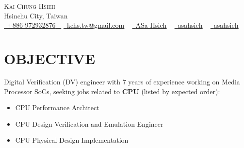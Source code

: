\documentclass[letterpaper,11pt]{article}
\newcommand{\resumeItem}[1]{
  \item\small{
    {#1 \vspace{-0.5pt}}
  }
}
\newcommand{\resumeItemListStart}{\begin{itemize}}
\newcommand{\resumeItemListEnd}{\end{itemize}\vspace{-5pt}}
\begin{document}


\begin{center}
    {\Huge \scshape Kai-Chung Hsieh} \\ \vspace{1pt}
    Hsinchu City, Taiwan \\ \vspace{1pt}
    \small \href{tel:+886972932876}{ \raisebox{-0.1\height}\faPhone\ \underline{+886-972932876} ~} \href{mailto:kchs.tw@gmail.com}{\raisebox{-0.2\height}\faGoogle\  \underline{kchs.tw@gmail.com}} ~ 
    \href{https://linkedin.com/in/asa-hsieh}{\raisebox{-0.2\height}\faLinkedinSquare\ \underline{ASa Hsieh}}  ~
    \href{https://github.com/asahsieh}{\raisebox{-0.2\height}\faGithub\ \underline{asahsieh}} ~
    \href{https://hackmd.io/@asahsieh}{\raisebox{-0.2\height}\faBook\ \underline{asahsieh}} ~
    \vspace{-8pt}
\end{center}
 

\section{OBJECTIVE}
    {Digital Verification (DV) engineer with 7 years of experience working on Media Processor SoCs, seeking jobs related to \textbf{CPU} (listed by expected order):}
        \resumeItemListStart
            \resumeItem{\normalsize{CPU Performance Architect}}
            \vspace{-5pt}
            \resumeItem{\normalsize{CPU Design Verification and Emulation Engineer}}
             \vspace{-5pt}
            \resumeItem{\normalsize{CPU Physical Design Implementation}}
        \resumeItemListEnd
    \vspace{-6pt}
     
\end{document}
